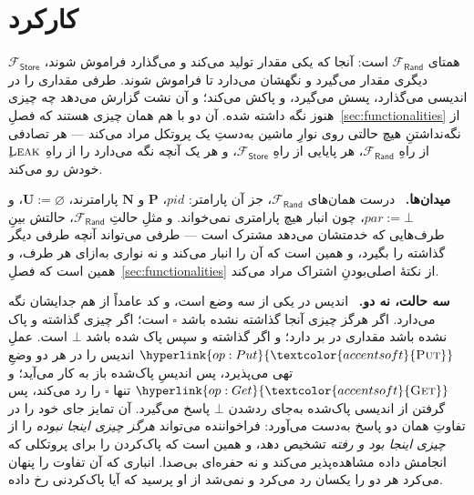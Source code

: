 \documentclass[10pt,oneside,openany]{book}
\newcommand{\Ps}{\mathbf{P}}
\newcommand{\PID}{\mathit{pid}}
\renewcommand{\emptyset}{\varnothing}
\newcommand{\admits}{\mathbf{N}}
\newcommand{\pars}{\mathit{par}}
\newcommand{\uses}{\mathbf{U}}
\newcommand{\op}[1]{\textnormal{\textsc{#1}}}
\newcommand{\opl}[1]{\hyperlink{op:#1}{\textcolor{accentsoft}{\op{#1}}}}
\newcommand{\Frand}{\mathcal{F}_{\mathsf{Rand}}}
\newcommand{\Fstore}{\mathcal{F}_{\mathsf{Store}}}
\newcommand{\unset}{\square}
\newcommand{\none}{\bot}
\newcommand{\heading}[1]{\medskip\par\noindent\textcolor{accent}{\textbf{#1.}}\ }
\theoremstyle{accentdef}
\theoremstyle{accentplain}
\begin{document}
\section{کارکرد}\label{sec:fstorefunc}

$\Fstore$ همتای $\Frand$ است: آنجا که یکی مقدار تولید می‌کند و می‌گذارد
فراموش شوند، دیگری مقدار می‌گیرد و نگهشان می‌دارد تا فراموش شوند. طرفی
مقداری را در اندیسی می‌گذارد، پسش می‌گیرد، و پاکش می‌کند؛ و آن نشت گزارش
می‌دهد چه چیزی هنوز نگه داشته شده. آن دو با هم همان چیزی هستند که
فصلِ~\ref{sec:functionalities} از نگه‌نداشتنِ هیچ حالتی روی نوارِ ماشین
به‌دستِ یک پروتکل مراد می‌کند --- هر تصادفی از راهِ $\Frand$، هر پایایی از
راهِ $\Fstore$، و هر یک آنچه نگه می‌دارد را از راهِ $\op{Leak}$ِ خودش رو
می‌کند.

\heading{میدان‌ها} درست همان‌های $\Frand$، جز آن پارامتر: $\PID$، $\Ps$ و
$\admits$ پارامترند، $\uses := \emptyset$، و $\pars := \none$، چون انبار
هیچ پارامتری نمی‌خواند. و مثلِ حالتِ $\Frand$، حالتش بینِ طرف‌هایی که خدمتشان
می‌دهد مشترک است --- طرفی می‌تواند آنچه طرفی دیگر گذاشته را بگیرد، و همین
است که آن را انبار می‌کند و نه نواری به‌ازای هر طرف، و همین است که
فصلِ~\ref{sec:functionalities} از نکتهٔ اصلی‌بودنِ اشتراک مراد می‌کند.

\heading{سه حالت، نه دو} اندیس در یکی از سه وضع است، و کد عامداً از هم
جدایشان نگه می‌دارد. اگر هرگز چیزی آنجا گذاشته نشده باشد $\unset$ است؛ اگر
چیزی گذاشته و پاک نشده باشد مقداری در بر دارد؛ و اگر گذاشته و سپس پاک شده
باشد $\none$ است. عملِ $\opl{Put}$ اندیس را در هر دو وضعِ تهی می‌پذیرد، پس
اندیسِ پاک‌شده باز به کار می‌آید؛ و $\opl{Get}$ تنها $\unset$ را رد می‌کند،
پس گرفتن از اندیسی پاک‌شده به‌جای رد‌شدن $\none$ پاسخ می‌گیرد. آن تمایز جای
خود را در تفاوتِ همان دو پاسخ به‌دست می‌آورد: فراخواننده می‌تواند
\emph{هرگز چیزی اینجا نبوده} را از \emph{چیزی اینجا بود و رفته} تشخیص دهد، و
همین است که پاک‌کردن را برای پروتکلی که انجامش داده مشاهده‌پذیر می‌کند و نه
حفره‌ای بی‌صدا. انباری که آن تفاوت را پنهان می‌کرد هر دو را یکسان رد می‌کرد
و نمی‌شد از او پرسید که آیا پاک‌کردنی رخ داده.
\end{document}
